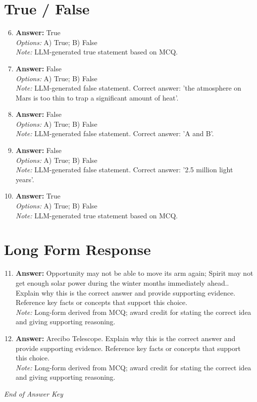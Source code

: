 \documentclass[12pt]{article}
\begin{document}
\section*{True / False}
\begin{enumerate}[label=\arabic*.]
\setcounter{enumi}{5}
\item \textbf{Answer:} True
\\ \textit{Options:} A) True; B) False
\\ \textit{Note:} LLM-generated true statement based on MCQ.
\item \textbf{Answer:} False
\\ \textit{Options:} A) True; B) False
\\ \textit{Note:} LLM-generated false statement. Correct answer: 'the atmosphere on Mars is too thin to trap a significant amount of heat'.
\item \textbf{Answer:} False
\\ \textit{Options:} A) True; B) False
\\ \textit{Note:} LLM-generated false statement. Correct answer: 'A and B'.
\item \textbf{Answer:} False
\\ \textit{Options:} A) True; B) False
\\ \textit{Note:} LLM-generated false statement. Correct answer: '2.5 million light years'.
\item \textbf{Answer:} True
\\ \textit{Options:} A) True; B) False
\\ \textit{Note:} LLM-generated true statement based on MCQ.
\end{enumerate}

\section*{Long Form Response}
\begin{enumerate}[label=\arabic*.]
\setcounter{enumi}{10}
\item \textbf{Answer:} Opportunity may not be able to move its arm again; Spirit may not get enough solar power during the winter months immediately ahead.. Explain why this is the correct answer and provide supporting evidence. Reference key facts or concepts that support this choice.
\\ \textit{Note:} Long-form derived from MCQ; award credit for stating the correct idea and giving supporting reasoning.
\item \textbf{Answer:} Arecibo Telescope. Explain why this is the correct answer and provide supporting evidence. Reference key facts or concepts that support this choice.
\\ \textit{Note:} Long-form derived from MCQ; award credit for stating the correct idea and giving supporting reasoning.
\end{enumerate}

\vfill
\noindent\textit{End of Answer Key}
\end{document}
